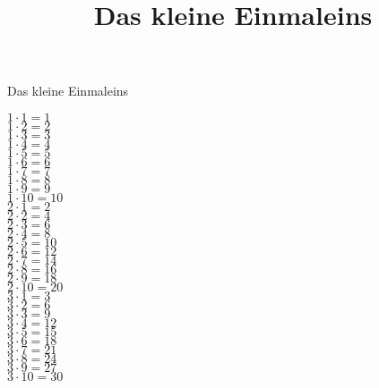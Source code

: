 \documentclass{article}
\title{Das kleine Einmaleins}
\begin{document}
{\huge \noindent Das kleine Einmaleins}

\begin{multicols}{3}
\noindent
$1 \cdot 1 = 1$ \\
$1 \cdot 2 = 2$ \\
$1 \cdot 3 = 3$ \\
$1 \cdot 4 = 4$ \\
$1 \cdot 5 = 5$ \\
$1 \cdot 6 = 6$ \\
$1 \cdot 7 = 7$ \\
$1 \cdot 8 = 8$ \\
$1 \cdot 9 = 9$ \\
$1 \cdot 10= 10$ \\

\noindent
$2 \cdot 1 = 2$ \\
$2 \cdot 2 = 4$ \\
$2 \cdot 3 = 6$ \\
$2 \cdot 4 = 8$ \\
$2 \cdot 5 = 10$ \\
$2 \cdot 6 = 12$ \\
$2 \cdot 7 = 14$ \\
$2 \cdot 8 = 16$ \\
$2 \cdot 9 = 18$ \\
$2 \cdot 10 = 20$ \\

\noindent
$3 \cdot 1 = 3$ \\
$3 \cdot 2 = 6$ \\
$3 \cdot 3 = 9$ \\
$3 \cdot 4 = 12$ \\
$3 \cdot 5 = 15$ \\
$3 \cdot 6 = 18$ \\
$3 \cdot 7 = 21$ \\
$3 \cdot 8 = 24$ \\
$3 \cdot 9 = 27$ \\
$3 \cdot 10 = 30$ \\
\end{multicols}
\end{document}

